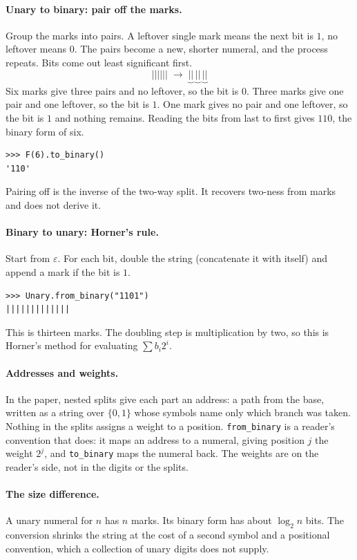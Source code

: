 \documentclass[11pt]{article}
\newcommand{\m}{\texttt{|}}
\begin{document}
\paragraph{Unary to binary: pair off the marks.}
Group the marks into pairs. A leftover single mark means the next bit is $1$,
no leftover means $0$. The pairs become a new, shorter numeral, and the process
repeats. Bits come out least significant first.
\[
\m\m\m\m\m\m\;\to\; \underbrace{\m\m}\,\underbrace{\m\m}\,\underbrace{\m\m}
\]
Six marks give three pairs and no leftover, so the bit is $0$. Three marks give one
pair and one leftover, so the bit is $1$. One mark gives no pair and one leftover,
so the bit is $1$ and nothing remains. Reading the bits from last to first gives
$110$, the binary form of six.
\begin{lstlisting}
>>> F(6).to_binary()
'110'
\end{lstlisting}
Pairing off is the inverse of the two-way split. It recovers two-ness from marks and
does not derive it.

\paragraph{Binary to unary: Horner's rule.} Start from $\varepsilon$. For each bit,
double the string (concatenate it with itself) and append a mark if the bit is $1$.
\begin{lstlisting}
>>> Unary.from_binary("1101")
|||||||||||||
\end{lstlisting}
This is thirteen marks. The doubling step is multiplication by two, so this is
Horner's method for evaluating $\sum b_i 2^i$.

\paragraph{Addresses and weights.} In the paper, nested splits give each part an
address: a path from the base, written as a string over $\{0,1\}$ whose symbols name
only which branch was taken. Nothing in the splits assigns a weight to a position.
\texttt{from\_binary} is a reader's convention that does: it maps an address to a
numeral, giving position $j$ the weight $2^j$, and \texttt{to\_binary} maps the
numeral back. The weights are on the reader's side, not in the digits or the splits.

\paragraph{The size difference.} A unary numeral for $n$ has $n$ marks. Its binary
form has about $\log_2 n$ bits. The conversion shrinks the string at the cost of a
second symbol and a positional convention, which a collection of unary digits does
not supply.
\end{document}
